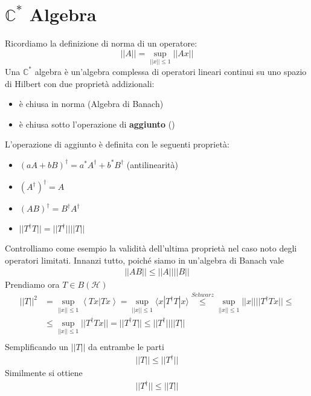 \section{$\mathbb{C} ^*$ Algebra} %
Ricordiamo la definizione di norma di un operatore:
$$||A||=\sup_{||x||\le 1}{||Ax||}$$
Una $\mathbb{C}^*$ algebra è un'algebra complessa di operatori lineari continui su uno spazio di Hilbert con due proprietà addizionali:
\begin{itemize}
\item è chiusa in norma (Algebra di Banach)
\item è chiusa sotto l'operazione di \textbf{aggiunto} (\dag)
\end{itemize}
L'operazione di aggiunto è definita con le seguenti proprietà:
\begin{itemize}
\item $ (aA+bB)^\dag=a^*A^\dag+b^*B^\dag$ (antilinearità)
\item $ (A^\dag)^\dag=A$
\item $\left(AB\right)^\dag= B^\dag A^\dag$
\item $||T^\dag T||=||T^\dag|| ||T||$
\end{itemize}
Controlliamo come esempio la validità dell'ultima proprietà nel caso noto degli operatori limitati.
Innanzi tutto, poiché siamo in un'algebra di Banach vale
\begin{equation*}\begin{split}
||AB||\le ||A||||B||
\end{split}\end{equation*}
Prendiamo ora $T \in B(\mathcal{H})$
\begin{equation*}\begin{split}
||T||^2 &=\sup_{||x||\le 1}{\left\langle Tx|Tx \right\rangle}=\sup_{||x||\le 1}{\langle x|T^\dag T|x\rangle} \overset{Schwarz}{\le}\sup_{||x||\le 1}{||x||||T^\dag Tx||} \le \\
&\le \sup_{||x||\le 1}{||T^\dag Tx||}=||T^\dag T||\le ||T^\dag||||T|| \\
\end{split}\end{equation*}
Semplificando un $||T||$ da entrambe le parti
\begin{equation*}\begin{split}
||T||\le ||T^\dag||
\end{split}\end{equation*}
Similmente si ottiene
\begin{equation*}\begin{split}
||T^\dag||\le ||T||
\end{split}\end{equation*}
